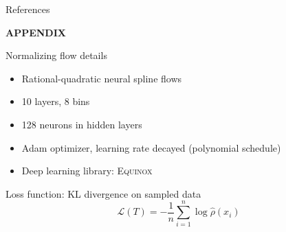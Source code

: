\documentclass[usenames,dvipsnames,t]{beamer}
\begin{document}
\begin{frame}{References}

\nocite{*}

\printbibliography
    
\end{frame}


\appendix

\begin{frame}
\vfill
\centering
\textbf{APPENDIX}
\vfill
\end{frame}

\begin{frame}{Normalizing flow details}

  \def\x{3mm}

  \vspace{\x}

  \begin{itemize}
    \item Rational-quadratic neural spline flows
    
    \vspace{\x}
    
    \item 10 layers, 8 bins
    
    \vspace{\x}
    
    \item 128 neurons in hidden layers
    
    \vspace{\x}
    
    \item Adam optimizer, learning rate decayed (polynomial schedule)
    
    \vspace{\x}
    
    \item Deep learning library: \textsc{Equinox}
  \end{itemize}

  \vspace{\x}

  Loss function: KL divergence on sampled data
  \begin{equation*}
    \mathcal{L}(T) = - \frac1n \sum_{i=1}^n \log \hat{\rho}(x_i)
  \end{equation*}
  
\end{frame}
\end{document}
